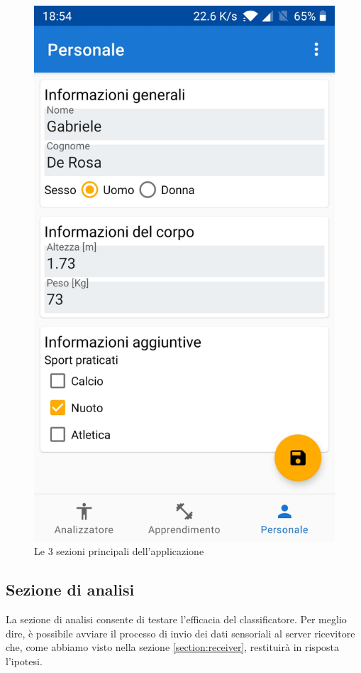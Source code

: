 \begin{figure}[H]
    \includegraphics[scale = 0.1019]{assets/images/screenshots/3a_Init.jpg}
    \caption{Le 3 sezioni principali dell'applicazione}
    \label{fig:screenshots}
\end{figure}

\subsection{Sezione di analisi}
La sezione di analisi consente di testare l'efficacia del classificatore. Per meglio dire, è possibile avviare il processo di invio 
dei dati sensoriali al server ricevitore che, come abbiamo visto nella sezione \ref{section:receiver}, restituirà in risposta l'ipotesi.

